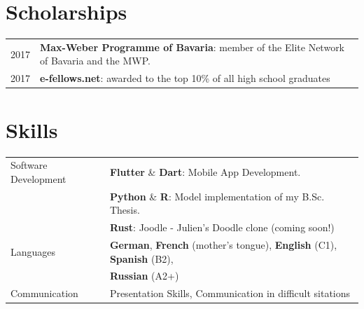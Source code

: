 \documentclass[a4paper,12pt]{article}
\begin{document}
\section{Scholarships}
\begin{tabularx}{\linewidth}{@{}l X@{}}
2017 &  \normalsize{\textbf{Max-Weber Programme of Bavaria}: member of the Elite Network of Bavaria and the MWP.}\\
2017 &  \normalsize{\textbf{e-fellows.net}: awarded to the top 10\% of all high school graduates}\\  
\end{tabularx}

\section{Skills}
\begin{tabularx}{\linewidth}{@{}l X@{}}
Software Development &  \normalsize{\textbf{Flutter} \& \textbf{Dart}: Mobile App Development.}\\
& \normalsize{\textbf{Python} \& \textbf{R}: Model implementation of my B.Sc.\,Thesis.}\\
& \normalsize{\textbf{Rust}: Joodle - Julien's Doodle clone (coming soon!)}\\
Languages &  \normalsize{\textbf{German}, \textbf{French} (mother's tongue), \textbf{English} (C1), \textbf{Spanish} (B2),}\\  
& \normalsize{\textbf{Russian} (A2+)}\\
Communication &  \normalsize{Presentation Skills, Communication in difficult sitations }\\  
\end{tabularx}

\vfill
{}
\end{document}
